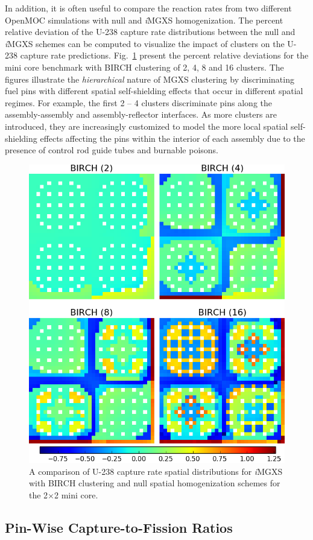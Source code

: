 \documentclass[12pt,twoside]{mitthesis-exec}
\begin{document}
In addition, it is often useful to compare the reaction rates from two different OpenMOC simulations with null and \textit{i}MGXS homogenization. The percent relative deviation of the U-238 capture rate distributions between the null and \textit{i}MGXS schemes can be computed to visualize the impact of clusters on the U-238 capture rate predictions. Fig.~\ref{fig:refl-capt-rates-comp} present the percent relative deviations for the mini core benchmark with BIRCH clustering of 2, 4, 8 and 16 clusters. The figures illustrate the \textit{hierarchical} nature of MGXS clustering by discriminating fuel pins with different spatial self-shielding effects that occur in different spatial regimes. For example, the first 2 -- 4 clusters discriminate pins along the assembly-assembly and assembly-reflector interfaces. As more clusters are introduced, they are increasingly customized to model the more local spatial self-shielding effects affecting the pins within the interior of each assembly due to the presence of control rod guide tubes and burnable poisons.

\begin{figure}[h!]
\centering
\includegraphics[width=0.63\linewidth]{figures/results/compare/reflector/compare-capt}
\caption[U-238 capture rate comparison for the mini core]{A comparison of U-238 capture rate spatial distributions for \textit{i}MGXS with BIRCH clustering and null spatial homogenization schemes for the 2$\times$2 mini core.}
\label{fig:refl-capt-rates-comp}
\end{figure}

\subsection*{Pin-Wise Capture-to-Fission Ratios}
\end{document}
